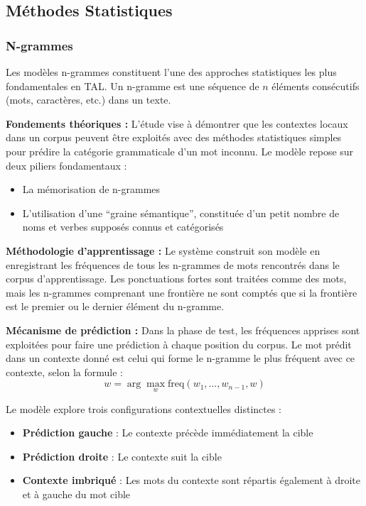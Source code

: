 \subsection{Méthodes Statistiques}

\subsubsection{N-grammes}

Les modèles n-grammes constituent l'une des approches statistiques les plus fondamentales en TAL. Un n-gramme est une séquence de $n$ éléments consécutifs (mots, caractères, etc.) dans un texte.

\textbf{Fondements théoriques :}
L'étude vise à démontrer que les contextes locaux dans un corpus peuvent être exploités avec des méthodes statistiques simples pour prédire la catégorie grammaticale d'un mot inconnu. Le modèle repose sur deux piliers fondamentaux :
\begin{itemize}
    \item La mémorisation de n-grammes
    \item L'utilisation d'une \enquote{graine sémantique}, constituée d'un petit nombre de noms et verbes supposés connus et catégorisés
\end{itemize}

\textbf{Méthodologie d'apprentissage :}
Le système construit son modèle en enregistrant les fréquences de tous les n-grammes de mots rencontrés dans le corpus d'apprentissage. Les ponctuations fortes sont traitées comme des mots, mais les n-grammes comprenant une frontière ne sont comptés que si la frontière est le premier ou le dernier élément du n-gramme.

\textbf{Mécanisme de prédiction :}
Dans la phase de test, les fréquences apprises sont exploitées pour faire une prédiction à chaque position du corpus. Le mot prédit dans un contexte donné est celui qui forme le n-gramme le plus fréquent avec ce contexte, selon la formule :
\[
w = \arg\max_w \text{freq}(w_1, \ldots, w_{n-1}, w)
\]

Le modèle explore trois configurations contextuelles distinctes :
\begin{itemize}
    \item \textbf{Prédiction gauche} : Le contexte précède immédiatement la cible
    \item \textbf{Prédiction droite} : Le contexte suit la cible
    \item \textbf{Contexte imbriqué} : Les mots du contexte sont répartis également à droite et à gauche du mot cible
\end{itemize}

